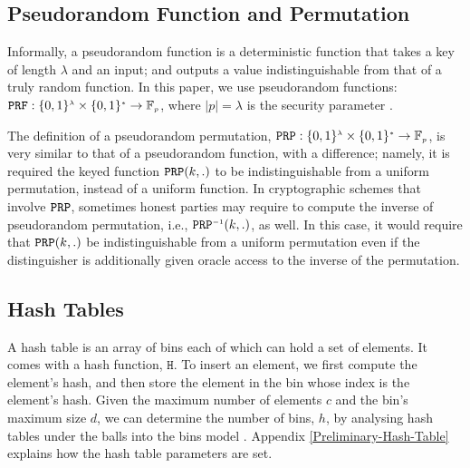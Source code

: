 %

\vs
\vs
\subsection{Pseudorandom Function and Permutation}
\svs

Informally, a pseudorandom function is a deterministic function that takes a key of length $\lambda$ and an input; and outputs a value  indistinguishable from that of  a truly random function.  In this paper, we use pseudorandom functions:   $\mathtt {PRF}: \{0,1\}^{\scriptscriptstyle \lambda}\times \{0,1\}^{\scriptscriptstyle *} \rightarrow  \mathbb{F}_{\scriptscriptstyle p}$, where $|p|=\lambda$ is the security parameter \cite{DBLP:books/crc/KatzLindell2007}. 


The definition of a pseudorandom permutation, $\mathtt {PRP}: \{0,1\}^{\scriptscriptstyle \lambda}\times \{0,1\}^{\scriptscriptstyle *} \rightarrow  \mathbb{F}_{\scriptscriptstyle p}$, is very similar to that of a pseudorandom function, with a difference; namely, it is required the keyed function $\mathtt{PRP}(k,.)$ to be indistinguishable from a uniform permutation, instead of a uniform function. In cryptographic schemes that involve $\mathtt{PRP}$, sometimes honest parties may require to compute the inverse of pseudorandom permutation, i.e., $\mathtt {PRP}^{\scriptscriptstyle -1}(k, .)$, as well. In this case, it would require that $\mathtt{PRP}(k,.)$ be indistinguishable from a uniform permutation even if the distinguisher is additionally given oracle access to the inverse of the permutation. 


\vs



\vs

\subsection{Hash Tables}

\svs

A hash table is an array of  bins each of which can hold a set of elements. It comes with a hash function, $\mathtt{H}$. To insert an element, we first compute the element's hash,  and then store the element in the bin whose index is the element's hash. Given the maximum number of elements $c$ and the bin's maximum size $d$, we can determine the number of bins, $h$, by analysing hash tables under the balls into the bins model  \cite{DBLP:conf/stoc/BerenbrinkCSV00}. Appendix \ref{Preliminary-Hash-Table} explains how the hash table parameters are set.

